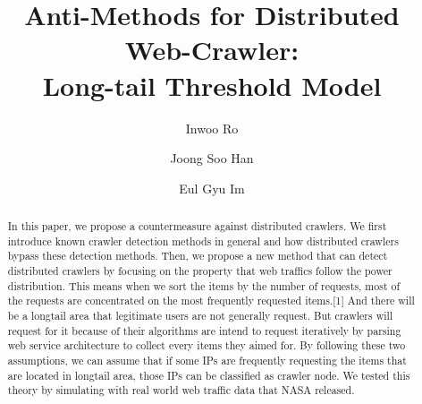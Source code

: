 \documentclass[sigconf,anonymous=true]{acmart}
\begin{document}
\title{Anti-Methods for Distributed Web-Crawler:\\ Long-tail Threshold Model}

\author{Inwoo Ro}

\author{Joong Soo Han}

\author{Eul Gyu Im}



\begin{abstract}
In this paper, we propose a countermeasure against distributed crawlers. We first introduce known crawler detection methods in general and how distributed crawlers bypass these detection methods. Then, we propose a new method that can detect distributed crawlers by focusing on the property that web traffics follow the power distribution. This means when we sort the items by the number of requests, most of the requests are concentrated on the most frequently requested items.[1] And there will be a longtail area that legitimate users are not generally request. But crawlers will request for it because of their algorithms are intend to request iteratively by parsing web service architecture to collect every items they aimed for. By following these two assumptions, we can assume that if some IPs are frequently requesting the items that are located in longtail area, those IPs can be classified as crawler node. We tested this theory by simulating with real world web traffic data that NASA released.
\end{abstract}


\end{document}
